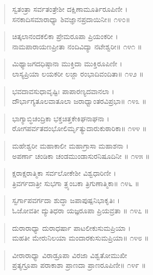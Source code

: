 \begin{verse}
ಸ್ವತಂತ್ರಾ ಸರ್ವತಂತ್ರೇಶೀ ದಕ್ಷಿಣಾಮೂರ್ತಿರೂಪಿಣೀ ।\\ಸನಕಾದಿಸಮಾರಾಧ್ಯಾ ಶಿವಜ್ಞಾನಪ್ರದಾಯಿನೀ\num{॥ ೧೪೦॥}
\end{verse}

\begin{verse}
ಚಿತ್ಕಲಾನಂದಕಲಿಕಾ ಪ್ರೇಮರೂಪಾ  ಪ್ರಿಯಂಕರೀ ।\\ನಾಮಪಾರಾಯಣಪ್ರೀತಾ ನಂದಿವಿದ್ಯಾ ನಟೇಶ್ವರೀ\num{॥ ೧೪೧ ॥}
\end{verse}

\begin{verse}
ಮಿಥ್ಯಾಜಗದಧಿಷ್ಠಾನಾ ಮುಕ್ತಿದಾ ಮುಕ್ತಿರೂಪಿಣೀ ।\\ಲಾಸ್ಯಪ್ರಿಯಾ ಲಯಕರೀ ಲಜ್ಜಾ  ರಂಭಾದಿವಂದಿತಾ\num{॥ ೧೪೨ ॥}
\end{verse}

\begin{verse}
ಭವದಾವಸುಧಾವೃಷ್ಟಿಃ ಪಾಪಾರಣ್ಯದವಾನಲಾ ।\\ದೌರ್ಭಾಗ್ಯತೂಲವಾತೂಲಾ ಜರಾಧ್ವಾಂತರವಿಪ್ರಭಾ\num{॥ ೧೪೩ ॥}
\end{verse}

\begin{verse}
ಭಾಗ್ಯಾಬ್ಧಿಚಂದ್ರಿಕಾ ಭಕ್ತಚಿತ್ತಕೇಕಿಘನಾಘನಾ ।\\ರೋಗಪರ್ವತದಂಭೋಲಿರ್ಮೃತ್ಯುದಾರುಕುಠಾರಿಕಾ\num{॥ ೧೪೪ ॥}
\end{verse}

\begin{verse}
ಮಹೇಶ್ವರೀ  ಮಹಾಕಾಲೀ ಮಹಾಗ್ರಾಸಾ ಮಹಾಶನಾ ।\\ಅಪರ್ಣಾ ಚಂಡಿಕಾ ಚಂಡಮುಂಡಾಸುರನಿಷೂದಿನೀ \num{॥ ೧೪೫ ॥}
\end{verse}

\begin{verse}
ಕ್ಷರಾಕ್ಷರಾತ್ಮಿಕಾ ಸರ್ವಲೋಕೇಶೀ ವಿಶ್ವಧಾರಿಣೀ ।\\ತ್ರಿವರ್ಗದಾತ್ರೀ  ಸುಭಗಾ ತ್ರ್ಯಂಬಕಾ ತ್ರಿಗುಣಾತ್ಮಿಕಾ\num{॥ ೧೪೬ ॥}
\end{verse}

\begin{verse}
ಸ್ವರ್ಗಾಪವರ್ಗದಾ ಶುದ್ಧಾ ಜಪಾಪುಷ್ಪನಿಭಾಕೃತಿಃ ।\\ಓಜೋವತೀ ದ್ಯುತಿಧರಾ ಯಜ್ಞರೂಪಾ ಪ್ರಿಯವ್ರತಾ \num{॥ ೧೪೭ ॥}
\end{verse}

\begin{verse}
ದುರಾರಾಧ್ಯಾ ದುರಾಧರ್ಷಾ ಪಾಟಲೀಕುಸುಮಪ್ರಿಯಾ ।\\ಮಹತೀ ಮೇರುನಿಲಯಾ ಮಂದಾರಕುಸುಮಪ್ರಿಯಾ\num{॥ ೧೪೮ ॥}
\end{verse}

\begin{verse}
ವೀರಾರಾಧ್ಯಾ ವಿರಾಡ್ರೂಪಾ ವಿರಜಾ ವಿಶ್ವತೋಮುಖೀ \\ಪ್ರತ್ಯಗ್ರೂಪಾ ಪರಾಕಾಶಾ ಪ್ರಾಣದಾ ಪ್ರಾಣರೂಪಿಣೀ\num{॥ ೧೪೯ ॥}
\end{verse}

